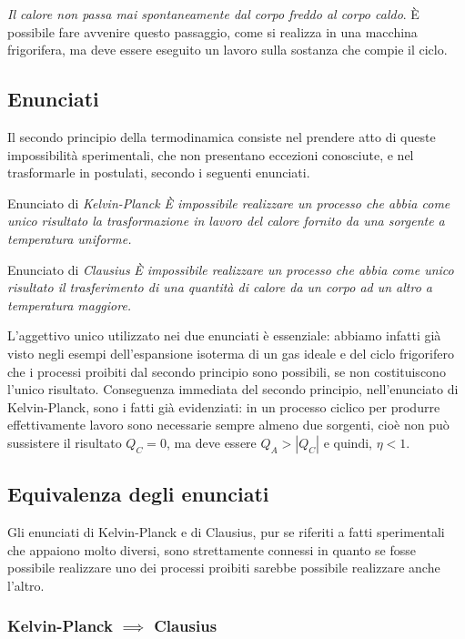 \documentclass[class=book, crop=false, oneside, 12pt]{standalone}
\begin{document}
\emph{Il calore non passa mai spontaneamente dal corpo freddo al corpo caldo}. 
È possibile fare avvenire questo passaggio, come si realizza in una macchina frigorifera, ma deve essere eseguito un lavoro sulla sostanza che compie il ciclo.

\subsection{Enunciati}

Il secondo principio della termodinamica consiste nel prendere atto di queste impossibilità sperimentali, che non presentano eccezioni conosciute, e  nel trasformarle in postulati, secondo i seguenti enunciati. 

Enunciato di \emph{Kelvin-Planck}\newline
\emph{È impossibile realizzare un processo che abbia come unico risultato la trasformazione in lavoro del calore fornito da una sorgente a temperatura uniforme.}

Enunciato di \emph{Clausius}\newline
\emph{È impossibile realizzare un processo che abbia come unico risultato il trasferimento di una quantità di calore da un corpo ad un altro a temperatura maggiore. }

L'aggettivo unico utilizzato nei due enunciati è essenziale: abbiamo infatti già visto negli esempi dell'espansione isoterma di un gas ideale e del ciclo frigorifero che i processi proibiti dal secondo principio sono possibili, se non costituiscono l'unico risultato. 
Conseguenza immediata del secondo principio, nell'enunciato di Kelvin-Planck, sono i fatti già evidenziati: in un processo ciclico per produrre effettivamente lavoro sono necessarie sempre almeno due sorgenti, cioè non può sussistere il risultato \(Q_C = 0\), ma deve essere \(Q_A > |Q_C|\) e quindi, \(\eta < 1\).

\subsection{Equivalenza degli enunciati}

Gli enunciati di Kelvin-Planck e di Clausius, pur se riferiti a fatti sperimentali che appaiono molto diversi, sono strettamente connessi in quanto se fosse possibile realizzare uno dei processi proibiti sarebbe possibile realizzare anche l'altro.

\subsubsection*{Kelvin-Planck \(\implies\) Clausius}
\end{document}
